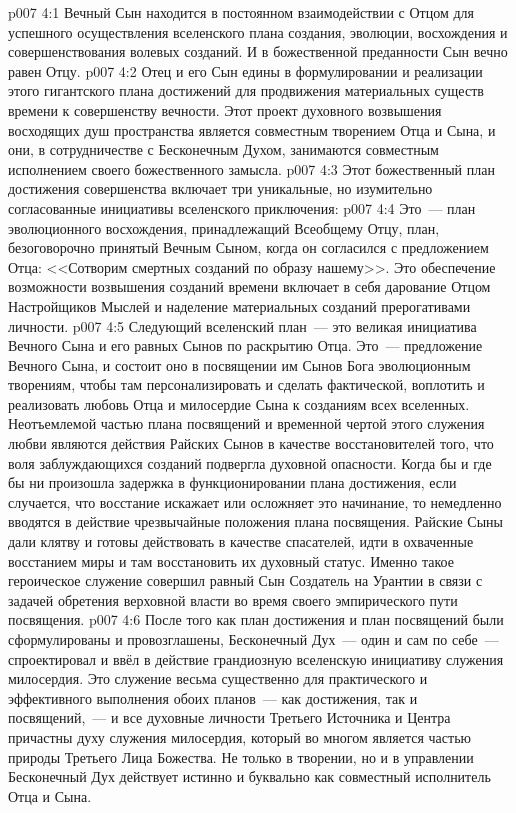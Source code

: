 \vs p007 4:1 Вечный Сын находится в постоянном взаимодействии с Отцом для успешного осуществления  вселенского плана создания, эволюции, восхождения и совершенствования волевых созданий. И в божественной преданности Сын вечно равен Отцу.
\vs p007 4:2 Отец и его Сын едины в формулировании и реализации этого гигантского плана достижений для продвижения материальных существ времени к совершенству вечности. Этот проект духовного возвышения восходящих душ пространства является совместным творением Отца и Сына, и они, в сотрудничестве с Бесконечным Духом, занимаются совместным исполнением своего божественного замысла.
\vs p007 4:3 \pc Этот божественный план достижения совершенства включает три уникальные, но изумительно согласованные инициативы вселенского приключения:
\vs p007 4:4  Это~--- план эволюционного восхождения, принадлежащий Всеобщему Отцу, план, безоговорочно принятый Вечным Сыном, когда он согласился с предложением Отца: <<Сотворим смертных созданий по образу нашему>>. Это обеспечение возможности возвышения созданий времени включает в себя дарование Отцом Настройщиков Мыслей и наделение материальных созданий прерогативами личности.
\vs p007 4:5  Следующий вселенский план~--- это великая инициатива Вечного Сына и его равных Сынов по раскрытию Отца. Это~--- предложение Вечного Сына, и состоит оно в посвящении им Сынов Бога эволюционным творениям, чтобы там персонализировать и сделать фактической, воплотить и реализовать любовь Отца и милосердие Сына к созданиям всех вселенных. Неотъемлемой частью плана посвящений и временной чертой этого служения любви являются действия Райских Сынов в качестве восстановителей того, что воля заблуждающихся созданий подвергла духовной опасности. Когда бы и где бы ни произошла задержка в функционировании плана достижения, если случается, что восстание искажает или осложняет это начинание, то немедленно вводятся в действие чрезвычайные положения плана посвящения. Райские Сыны дали клятву и готовы действовать в качестве спасателей, идти в охваченные восстанием миры и там восстановить их духовный статус. Именно такое героическое служение совершил равный Сын Создатель на Урантии в связи с задачей обретения верховной власти во время своего эмпирического пути посвящения.
\vs p007 4:6  После того как план достижения и план посвящений были сформулированы и провозглашены, Бесконечный Дух~--- один и сам по себе~--- спроектировал и ввёл в действие грандиозную вселенскую инициативу служения милосердия. Это служение весьма существенно для практического и эффективного выполнения обоих планов~--- как достижения, так и посвящений,~--- и все духовные личности Третьего Источника и Центра причастны духу служения милосердия, который во многом является частью природы Третьего Лица Божества. Не только в творении, но и в управлении Бесконечный Дух действует истинно и буквально как совместный исполнитель Отца и Сына.

